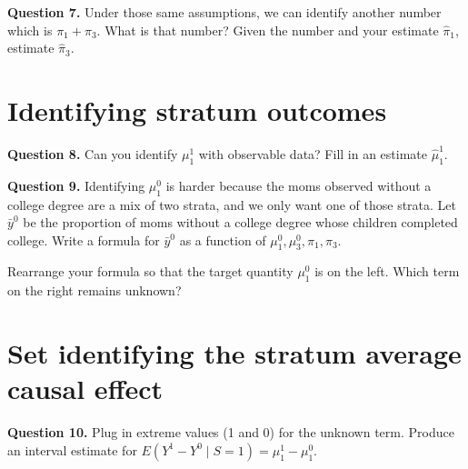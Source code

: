 \documentclass[10pt]{article}
\begin{document}
\textbf{Question 7.} Under those same assumptions, we can identify another number which is $\pi_1 + \pi_3$. What is that number? Given the number and your estimate $\hat\pi_1$, estimate $\hat\pi_3$.

\section*{Identifying stratum outcomes}

\textbf{Question 8.} Can you identify $\mu^1_1$ with observable data? Fill in an estimate $\hat\mu^1_1$.

\textbf{Question 9.} Identifying $\mu^0_1$ is harder because the moms observed without a college degree are a mix of two strata, and we only want one of those strata. Let $\bar{y}^0$ be the proportion of moms without a college degree whose children completed college. Write a formula for $\bar{y}^0$ as a function of $\mu^0_1,\mu^0_3,\pi_1,\pi_3$.

Rearrange your formula so that the target quantity $\mu^0_1$ is on the left. Which term on the right remains unknown?

\section*{Set identifying the stratum average causal effect}

\textbf{Question 10.} Plug in extreme values (1 and 0) for the unknown term. Produce an interval estimate for $E(Y^1 - Y^0\mid S = 1) = \mu^1_1 - \mu^0_1$.
\end{document}
